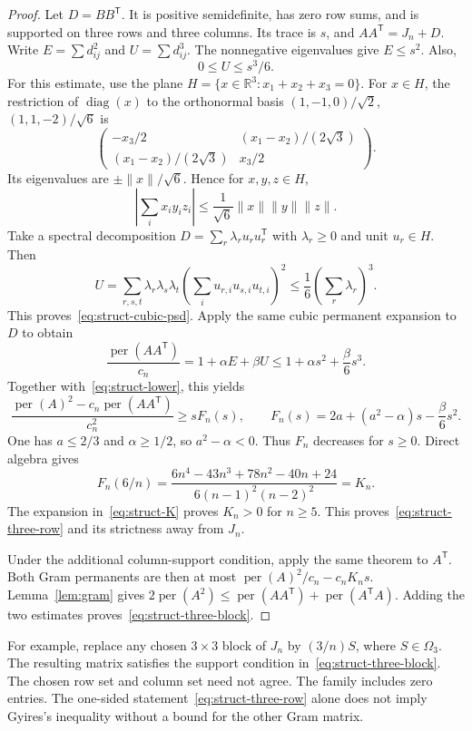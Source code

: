 \documentclass[11pt,a4paper]{article}
\theoremstyle{definition}
\theoremstyle{remark}
\newcommand{\R}{\mathbb{R}}
\newcommand{\per}{\operatorname{per}}
\newcommand{\T}{\mathsf{T}}
\begin{document}
\begin{proof}
Let $D=BB^\T$.
It is positive semidefinite, has zero row sums, and is supported on three rows and three columns.
Its trace is $s$, and $AA^\T=J_n+D$.
Write $E=\sum d_{ij}^2$ and $U=\sum d_{ij}^3$.
The nonnegative eigenvalues give $E\le s^2$.
Also,
\begin{equation}\label{eq:struct-cubic-psd}
 0\le U\le s^3/6.
\end{equation}
For this estimate, use the plane
$H=\{x\in\R^3:x_1+x_2+x_3=0\}$.
For $x\in H$, the restriction of $\operatorname{diag}(x)$ to the orthonormal basis
$(1,-1,0)/\sqrt2$, $(1,1,-2)/\sqrt6$ is
\[
 \begin{pmatrix}
 -x_3/2&(x_1-x_2)/(2\sqrt3)\\
 (x_1-x_2)/(2\sqrt3)&x_3/2
 \end{pmatrix}.
\]
Its eigenvalues are $\pm\|x\|/\sqrt6$.
Hence for $x,y,z\in H$,
\[
 \left|\sum_i x_i y_i z_i\right|
 \le\frac1{\sqrt6}\|x\|\|y\|\|z\|.
\]
Take a spectral decomposition
$D=\sum_r\lambda_r u_ru_r^\T$ with $\lambda_r\ge0$ and unit $u_r\in H$.
Then
\[
 U=\sum_{r,s,t}\lambda_r\lambda_s\lambda_t
 \left(\sum_i u_{r,i}u_{s,i}u_{t,i}\right)^2
 \le\frac16\left(\sum_r\lambda_r\right)^3.
\]
This proves~\eqref{eq:struct-cubic-psd}.
Apply the same cubic permanent expansion to $D$ to obtain
\[
 \frac{\per(AA^\T)}{c_n}
 =1+\alpha E+\beta U
 \le1+\alpha s^2+\frac\beta6s^3.
\]
Together with~\eqref{eq:struct-lower}, this yields
\[
 \frac{\per(A)^2-c_n\per(AA^\T)}{c_n^2}
 \ge sF_n(s),
 \qquad
 F_n(s)=2a+(a^2-\alpha)s-\frac\beta6s^2.
\]
One has $a\le2/3$ and $\alpha\ge1/2$, so $a^2-\alpha<0$.
Thus $F_n$ decreases for $s\ge0$.
Direct algebra gives
\[
 F_n(6/n)=
 \frac{6n^4-43n^3+78n^2-40n+24}{6(n-1)^2(n-2)^2}=K_n.
\]
The expansion in~\eqref{eq:struct-K} proves $K_n>0$ for $n\ge5$.
This proves~\eqref{eq:struct-three-row} and its strictness away from $J_n$.

Under the additional column-support condition, apply the same theorem to $A^\T$.
Both Gram permanents are then at most
$\per(A)^2/c_n-c_nK_ns$.
Lemma~\ref{lem:gram} gives
$2\per(A^2)\le\per(AA^\T)+\per(A^\T A)$.
Adding the two estimates proves~\eqref{eq:struct-three-block}.
\end{proof}

For example, replace any chosen $3\times3$ block of $J_n$ by $(3/n)S$, where $S\in\Omega_3$.
The resulting matrix satisfies the support condition in~\eqref{eq:struct-three-block}.
The chosen row set and column set need not agree.
The family includes zero entries.
The one-sided statement~\eqref{eq:struct-three-row} alone does not imply Gyires's inequality without a bound for the other Gram matrix.
\end{document}

